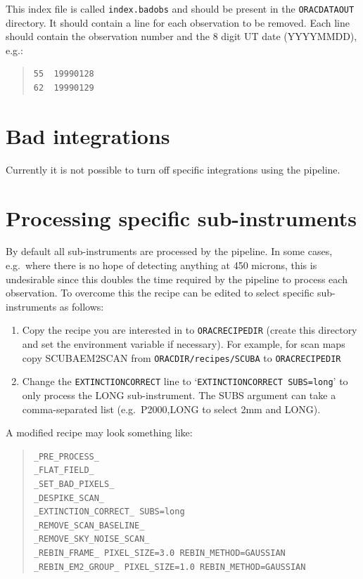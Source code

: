 \documentclass[twoside,11pt]{article}
\newcommand{\xlabel}[1]{}
\renewcommand{\_}{\texttt{\symbol{95}}}
\newcommand{\recipe}[1]{{\small\textsf{#1}}}
\newenvironment{myquote}{\begin{quote}\begin{small}}{\end{small}\end{quote}}
\begin{document}
This index file is called \texttt{index.badobs} and should be present in the
\texttt{ORAC\_DATA\_OUT} directory. It should contain a line for each observation to be
removed. Each line should contain the observation number and the 8 digit UT
date (YYYYMMDD), e.g.:

\begin{quote}
\begin{verbatim}
55  19990128
62  19990129
\end{verbatim}
\end{quote}



\section{Bad integrations\xlabel{bad_observations}}

Currently it is not possible to turn off specific integrations
using the pipeline.

\section{Processing specific sub-instruments\xlabel{processing_specific_sub_instruments}}

By default all sub-instruments are processed by the pipeline. In some
cases, e.g.\ where there is no hope of detecting anything at 450 microns,
this is undesirable since this doubles the time required by the pipeline
to process each observation. To overcome this the recipe can be
edited to select specific sub-instruments as follows:

\begin{enumerate}
\item Copy the recipe you are interested in to \texttt{ORAC\_RECIPE\_DIR}
(create this directory and set the environment variable if necessary). For
example, for scan maps copy \recipe{SCUBA\_EM2SCAN} from
\texttt{ORAC\_DIR/recipes/SCUBA} to \texttt{ORAC\_RECIPE\_DIR}

\item Change the \texttt{\_EXTINCTION\_CORRECT\_} line to
`\texttt{\_EXTINCTION\_CORRECT\_ SUBS=long}' to only process the LONG
sub-instrument. The SUBS argument can take a comma-separated list (e.g.\
P2000,LONG to select 2mm and LONG).

\end{enumerate}

A modified recipe may look something like:

\begin{myquote}
\begin{verbatim}
_PRE_PROCESS_
_FLAT_FIELD_
_SET_BAD_PIXELS_
_DESPIKE_SCAN_
_EXTINCTION_CORRECT_ SUBS=long
_REMOVE_SCAN_BASELINE_
_REMOVE_SKY_NOISE_SCAN_
_REBIN_FRAME_ PIXEL_SIZE=3.0 REBIN_METHOD=GAUSSIAN
_REBIN_EM2_GROUP_ PIXEL_SIZE=1.0 REBIN_METHOD=GAUSSIAN
\end{verbatim}
\end{myquote}
\end{document}
